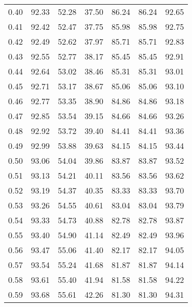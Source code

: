 \begin{tabular}{|c|c|c|c|c|c|c|}
      0.40 &     92.33 &     52.28 &      37.50 &   86.24 &      86.24 &         92.65 \\
      0.41 &     92.42 &     52.47 &      37.75 &   85.98 &      85.98 &         92.75 \\
      0.42 &     92.49 &     52.62 &      37.97 &   85.71 &      85.71 &         92.83 \\
      0.43 &     92.55 &     52.77 &      38.17 &   85.45 &      85.45 &         92.91 \\
      0.44 &     92.64 &     53.02 &      38.46 &   85.31 &      85.31 &         93.01 \\
      0.45 &     92.71 &     53.17 &      38.67 &   85.06 &      85.06 &         93.10 \\
      0.46 &     92.77 &     53.35 &      38.90 &   84.86 &      84.86 &         93.18 \\
      0.47 &     92.85 &     53.54 &      39.15 &   84.66 &      84.66 &         93.26 \\
      0.48 &     92.92 &     53.72 &      39.40 &   84.41 &      84.41 &         93.36 \\
      0.49 &     92.99 &     53.88 &      39.63 &   84.15 &      84.15 &         93.44 \\
      0.50 &     93.06 &     54.04 &      39.86 &   83.87 &      83.87 &         93.52 \\
      0.51 &     93.13 &     54.21 &      40.11 &   83.56 &      83.56 &         93.62 \\
      0.52 &     93.19 &     54.37 &      40.35 &   83.33 &      83.33 &         93.70 \\
      0.53 &     93.26 &     54.55 &      40.61 &   83.04 &      83.04 &         93.79 \\
      0.54 &     93.33 &     54.73 &      40.88 &   82.78 &      82.78 &         93.87 \\
      0.55 &     93.40 &     54.90 &      41.14 &   82.49 &      82.49 &         93.96 \\
      0.56 &     93.47 &     55.06 &      41.40 &   82.17 &      82.17 &         94.05 \\
      0.57 &     93.54 &     55.24 &      41.68 &   81.87 &      81.87 &         94.14 \\
      0.58 &     93.61 &     55.40 &      41.94 &   81.58 &      81.58 &         94.22 \\
      0.59 &     93.68 &     55.61 &      42.26 &   81.30 &      81.30 &         94.31 \\

\end{tabular}
